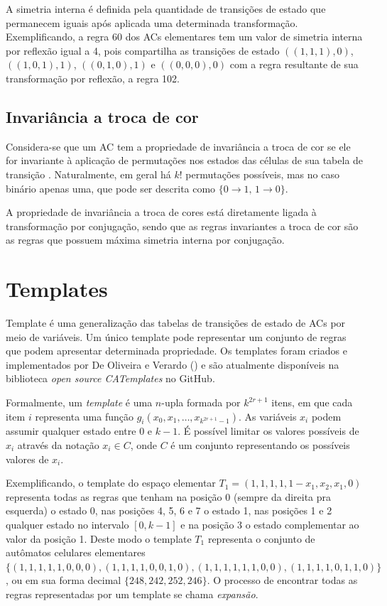 \documentclass[12pt, a4paper]{article}
\begin{document}
A simetria interna é definida pela quantidade de transições de estado que permanecem iguais após aplicada uma determinada transformação. Exemplificando, a regra 60 dos ACs elementares tem um valor de simetria interna por reflexão igual a 4, pois compartilha as transições de estado $((1,1,1),0)$, $((1,0,1),1)$, $((0,1,0),1)$ e $ ((0,0,0),0)$ com a regra resultante de sua transformação por reflexão, a regra 102.

\subsection{Invariância a troca de cor}
Considera-se que um AC tem a propriedade de invariância a troca de cor se ele for invariante à aplicação de permutações nos estados das células de sua tabela de transição \cite{salo2013color}. Naturalmente, em geral há $k!$ permutações possíveis, mas no caso binário apenas uma, que pode ser descrita como $\{0 \to 1 ,\, 1 \to 0\}$. 

A propriedade de invariância a troca de cores está diretamente ligada à transformação por conjugação, sendo que as regras invariantes a troca de cor são as regras que possuem máxima simetria interna por conjugação.

\section{Templates}
\label{sec:templates}
Template é uma generalização das tabelas de transições de estado de ACs por meio de variáveis. Um único template pode representar um conjunto de regras que podem apresentar determinada propriedade. Os templates foram criados e implementados por De Oliveira e Verardo (\citeyear{deOliveira2014}) e são atualmente disponíveis na biblioteca \textit{open source CATemplates} \cite{CATemplates} no GitHub.

Formalmente, um \textit{template} é uma $n$-upla formada por $k^{2r+1}$ itens, em que cada item $i$ representa uma função $g_i(x_0,x_1,\dots,x_{k^{2r+1}-1})$. As variáveis $x_i$ podem assumir qualquer estado entre 0 e $k-1$. É possível limitar os valores possíveis de $x_i$ através da notação $x_i \in C$, onde $C$ é um conjunto representando os possíveis valores de $x_i$. %

Exemplificando, o template do espaço elementar $T_1 = (1,1,1,1,1-x_1,x_2,x_1,0)$ representa todas as regras que tenham na posição 0 (sempre da direita pra esquerda) o estado 0, nas posições 4, 5, 6 e 7 o estado 1, nas posições 1 e 2 qualquer estado no intervalo $[0,k-1]$ e na posição 3 o estado complementar ao valor da posição 1. Deste modo o template $T_1$ representa o conjunto de autômatos celulares elementares $\{(1,1,1,1,1,0,0,0),(1,1,1,1,0,0,1,0),(1,1,1,1,1,1,0,0),(1,1,1,1,0,1,1,0)\}$, ou em sua forma decimal $\{248,242,252,246\}$. O processo de encontrar todas as regras representadas por um template se chama \textit{expansão}.
\end{document}

